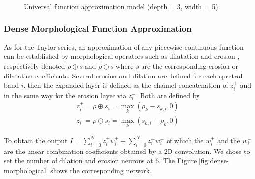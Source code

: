 \documentclass[../thesis.tex]{subfiles}
\begin{document}
	
	
	\begin{figure}[H]
		\centering
		
		\caption{ {Universal} function approximation model (depth = 3, width = 5).}
		\label{fig:universal-function-approximator}
	\end{figure}%
	
	
	\subsubsection{Dense Morphological Function Approximation} As for the Taylor series, an approximation of any piecewise continuous function can be established by morphological operators such as dilatation and erosion \cite{DenseMorpho}, respectively denoted $\rho \oplus s$ and $\rho \ominus s$ where $s$ are the corresponding erosion or dilatation coefficients. Several erosion and dilation are defined for each spectral band $i$, then the expanded layer is defined as the channel concatenation of $ z_i^{+}$ and in the same way for the erosion layer via $z_i^{-}$. Both are defined by
	\begin{eqnarray}
	z_i^{+} = \rho \oplus s_i = \max_k(\rho_k - s_{k,i}, 0) \\
	z_i^{-} = \rho \ominus s_i = \max_k(s_{k,i} - \rho_k, 0)
	\end{eqnarray}
	
	To obtain the output $I = \sum_{i=0}^{N}{z_i^{+}w_i^{+}} + \sum_{i=0}^{N}{z_i^{-}w_i^{-}}$ of which the $w_i^{+}$ and the $w_i^{-}$ are the linear combination coefficients obtained by a 2D convolution. We chose to set the number of dilation and erosion neurons at 6. The Figure \ref{fig:dense-morphological} shows the corresponding network.
	
\end{document}
